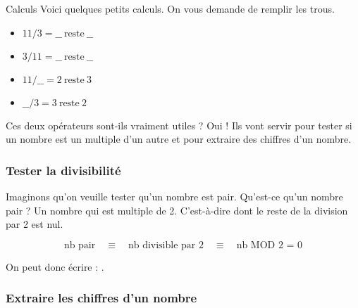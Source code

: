 			\begin{Exercice}{Calculs}
				Voici quelques petits calculs.
				On vous demande de remplir les trous.
				
				\begin{minipage}{6cm}
					\begin{itemize}
					\item $11/3 = \_\_\ \textrm{reste}\ \_\_$
					\item $3/11 = \_\_\ \textrm{reste}\ \_\_$
					\end{itemize}
				\end{minipage}
				\quad
				\begin{minipage}{6cm}
					\begin{itemize}
					\item $11/\_\_ = 2\ \textrm{reste}\ 3$
					\item $\_\_/3 = 3\ \textrm{reste}\ 2$
					\end{itemize}
				\end{minipage}
			\end{Exercice}
			
			\medskip
			Ces deux opérateurs sont-ils vraiment utiles ?
			Oui ! Ils vont servir pour tester si un nombre
			est un multiple d'un autre et pour extraire
			des chiffres d'un nombre.
			
			\subsubsection{Tester la divisibilité}
			
				Imaginons qu'on veuille tester qu'un nombre est pair.
				Qu'est-ce qu'un nombre pair ? Un nombre qui est multiple de 2.
				C'est-à-dire dont le reste de la division par 2 est nul.
				
				\begin{equation}
				\textrm{nb pair} 
					\quad\equiv\quad \textrm{nb divisible par 2} 
					\quad\equiv\quad \textrm{nb MOD 2 = 0} 
				\end{equation}
				
				On peut donc écrire : .
	
			\subsubsection{Extraire les chiffres d'un nombre}
			

